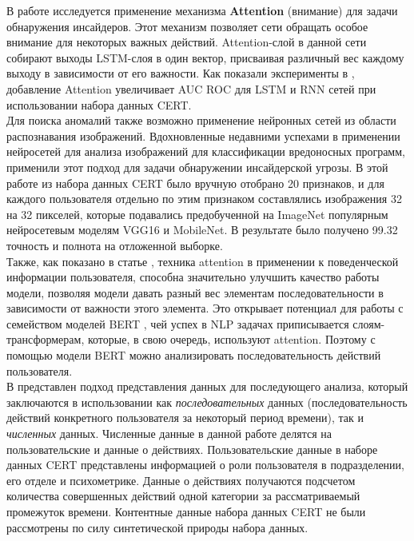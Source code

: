 В работе \cite{yuanAttentionBasedLSTMInsider2019} исследуется применение механизма \textbf{Attention} (внимание) для задачи обнаружения инсайдеров. Этот механизм позволяет сети обращать особое внимание для некоторых важных действий. Attention-слой в данной сети собирают выходы LSTM-слоя в один вектор, присваивая различный вес каждому выходу в зависимости от его важности. Как показали эксперименты в \cite{yuanAttentionBasedLSTMInsider2019}, добавление Attention увеличивает AUC ROC для LSTM и RNN сетей при использовании набора данных CERT.\\

Для поиска аномалий также возможно применение нейронных сетей из области распознавания изображений. Вдохновленные недавними успехами в применении нейросетей для анализа изображений для классификации вредоносных программ, \cite{gImageBasedFeatureRepresentation2019} применили этот подход для задачи обнаружении инсайдерской угрозы. В этой работе из набора данных CERT было вручную отобрано 20 признаков, и для каждого пользователя отдельно по этим признаком составлялись изображения 32 на 32 пикселей, которые подавались предобученной на ImageNet популярным нейросетевым моделям VGG16 и MobileNet. В результате было получено 99.32 точность и полнота на отложенной выборке.\\

Также, как показано в статье \cite{yuanAttentionBasedLSTMInsider2019}, техника attention в применении к поведенческой информации пользователя, способна значительно улучшить качество работы модели, позволяя модели давать разный вес элементам последовательности в зависимости от важности этого элемента. Это открывает потенциал для работы с семейством моделей BERT \cite{devlinBERTPretrainingDeep2019}, чей успех в NLP задачах приписывается слоям-трансформерам, которые, в свою очередь, используют attention. Поэтому с помощью модели BERT можно анализировать последовательность действий пользователя.\\

В \cite{leEvaluatingInsiderThreat2018} представлен подход представления данных для последующего анализа, который заключаются в использовании как \textit{последовательных} данных (последовательность действий конкретного пользователя за некоторый период времени), так и \textit{численных} данных. Численные данные в данной работе делятся на пользовательские и данные о действиях. Пользовательские данные в наборе данных CERT представлены информацией о роли пользователя в подразделении, его отделе и психометрике. Данные о действиях получаются подсчетом количества совершенных действий одной категории за рассматриваемый промежуток времени. Контентные данные набора данных CERT не были рассмотрены по силу синтетической природы набора данных.

